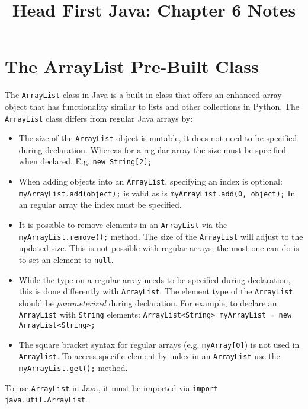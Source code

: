\documentclass{tufte-handout}
\title{Head First Java: Chapter 6 Notes}
\begin{document}
    \maketitle

    \section*{The ArrayList Pre-Built Class}
    The \texttt{ArrayList} class in Java is a built-in class that offers an enhanced array-object that has functionality similar to lists and other collections in Python. The \texttt{ArrayList} class differs from regular Java arrays by:

    \begin{itemize}
        \item The size of the \texttt{ArrayList} object is mutable, it does not need to be specified during declaration. Whereas for a regular array the size must be specified when declared. E.g. \texttt{new String[2];}
        \item When adding objects into an \texttt{ArrayList}, specifying an index is optional: \texttt{myArrayList.add(object);} is valid as is \texttt{myArrayList.add(0, object);} In an regular array the index must be specified.
        \item It is possible to remove elements in an \texttt{ArrayList} via the \texttt{myArrayList.remove();} method. The size of the \texttt{ArrayList} will adjust to the updated size. This is not possible with regular arrays; the most one can do is to set an element to \texttt{null}.
        \item While the type on a regular array needs to be specified during declaration, this is done differently with \texttt{ArrayList}. The element type of the \texttt{ArrayList} should be \emph{parameterized} during declaration. For example, to declare an \texttt{ArrayList} with \texttt{String} elements: \texttt{ArrayList<String> myArrayList = new ArrayList<String>;}
        \item The square bracket syntax for regular arrays (e.g. \texttt{myArray[0]}) is not used in \texttt{Arraylist}. To access specific element by index in an \texttt{ArrayList} use the \texttt{myArrayList.get();} method.
    \end{itemize}

    To use \texttt{ArrayList} in Java, it must be imported via \texttt{import java.util.ArrayList}.
    
\end{document}
